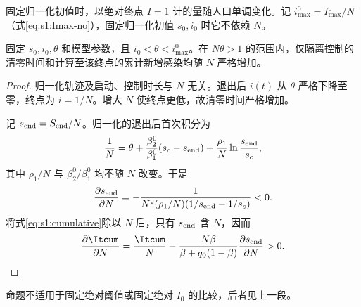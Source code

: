 固定归一化初值时，以绝对终点 $I=1$ 计的量随人口单调变化。记 $i_{\max}^{0}=I_{\max}^{0}/N$（式\eqref{eq:s1:Imax-no}），固定归一化初值 $s_0,i_0$ 时它不依赖 $N$。
\begin{proposition}
\label{prop:reference-population}
固定 $s_0,i_0,\theta$ 和模型参数，且 $i_0<\theta<i_{\max}^{0}$。在 $N\theta>1$ 的范围内，仅隔离控制的清零时间和计算至该终点的累计新增感染均随 $N$ 严格增加。
\end{proposition}
\begin{proof}
归一化轨迹及启动、控制时长与 $N$ 无关。退出后 $i(t)$ 从 $\theta$ 严格下降至零，终点为 $i=1/N$。增大 $N$ 使终点更低，故清零时间严格增加。

记 $s_{\rm end}=S_{\rm end}/N$。归一化的退出后首次积分为
\[
\frac1N=\theta+\frac{\beta_2^0}{\beta_1^0}(s_c-s_{\rm end})
+\frac{\rho_1}{N}\ln\frac{s_{\rm end}}{s_c},
\]
其中 $\rho_1/N$ 与 $\beta_2^0/\beta_1^0$ 均不随 $N$ 改变。于是
\[
\frac{\partial s_{\rm end}}{\partial N}
=-\frac1{N^2(\rho_1/N)(1/s_{\rm end}-1/s_c)}<0.
\]
将式\eqref{eq:s1:cumulative}除以 $N$ 后，只有 $s_{\rm end}$ 含 $N$，因而
\[
\frac{\partial\Itcum}{\partial N}
=\frac{\Itcum}{N}
-\frac{N\beta}{\beta+q_0(1-\beta)}\frac{\partial s_{\rm end}}{\partial N}>0.\qedhere
\]
\end{proof}
命题不适用于固定绝对阈值或固定绝对 $I_0$ 的比较，后者见上一段。

\FloatBarrier
